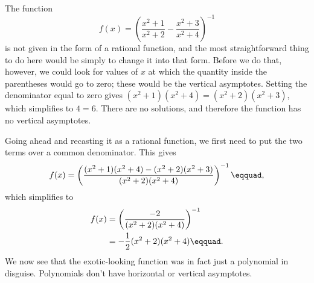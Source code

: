 The function
\begin{equation*}
  f(x) = \left(\frac{x^2+1}{x^2+2}-\frac{x^2+3}{x^2+4}\right)^{-1} 
\end{equation*}
is not given in the form of a rational function, and the most 
straightforward thing to do here would be simply to change it into
that form. Before we do that, however, we could look for values of
$x$ at which the quantity inside the parentheses would go to zero;
these would be the vertical asymptotes. Setting the denominator
equal to zero gives $(x^2+1)(x^2+4)=(x^2+2)(x^2+3)$, which simplifies
to $4=6$. There are no solutions, and therefore the function has no
vertical asymptotes.

Going ahead and recasting it as a rational function, we first need to
put the two terms over a common denominator. This gives
\begin{equation*}
  f(x) = \left(\frac{(x^2+1)(x^2+4)-(x^2+2)(x^2+3)}{(x^2+2)(x^2+4)}\right)^{-1}\eqquad,
\end{equation*}
which simplifies to
\begin{align*}
  f(x) &= \left(\frac{-2}{(x^2+2)(x^2+4)}\right)^{-1}   \\
       &= -\frac{1}{2}(x^2+2)(x^2+4)\eqquad.
\end{align*}
We now see that the exotic-looking function was in fact just a polynomial in
disguise. Polynomials don't have horizontal or vertical asymptotes.
